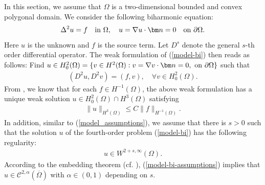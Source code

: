\documentclass[1996/10/24]{amsart}
\theoremstyle{definition}
\numberwithin{equation}{section}
\begin{document}
In this section, we assume that $\Omega$ is a two-dimensional bounded and convex
polygonal domain. We consider the following biharmonic equation:
\begin{align}
\Delta^2u=f\quad {\rm in}~\Omega,\quad u=\nabla u\cdot{\bm n}=0\quad {\rm on}~\partial\Omega.\label{model-bi}
\end{align}
Here $u$ is the unknown and $f$ is the source term.
Let $D^s$ denote the general $s$-th order differential operator. The weak formulation of (\ref{model-bi}) then reads as follows: Find
$u\in H_0^2(\Omega)=\{v\in H^2(\Omega): v=\nabla v\cdot{\bm n}=0,~{\rm on}~\partial\Omega\}$ such that
\begin{align}
(D^2u,D^2v)=(f,v),\quad \forall v\in H_0^2(\Omega).
\end{align}
From \cite[Sec. 5.9]{k1967}, we know that for each $f\in H^{-1}(\Omega)$, the above weak formulation has a unique weak solution $u\in H_0^2(\Omega)\cap H^3(\Omega)$ satisfying
\begin{align}
\|u\|_{H^3(\Omega)}\leq C\|f\|_{H^{-1}(\Omega)}.\label{bi-regularity}
\end{align}
In addition, similar to (\ref{model_assumptions}), we assume that there is $s>0$ such that the solution $u$ of the fourth-order problem (\ref{model-bi}) has the following regularity:
\begin{align}
u\in W^{2+s,\infty}(\Omega).\label{model-bi-assumptions}
\end{align}
According to the embedding theorem (cf. \cite[Theorem~$1.4.4.1$]{g1985}), (\ref{model-bi-assumptions}) implies that $u\in\mathcal{C}^{2,\alpha}(\overline{\Omega})$ with $\alpha\in(0,1)$ depending on $s$.
\end{document}
